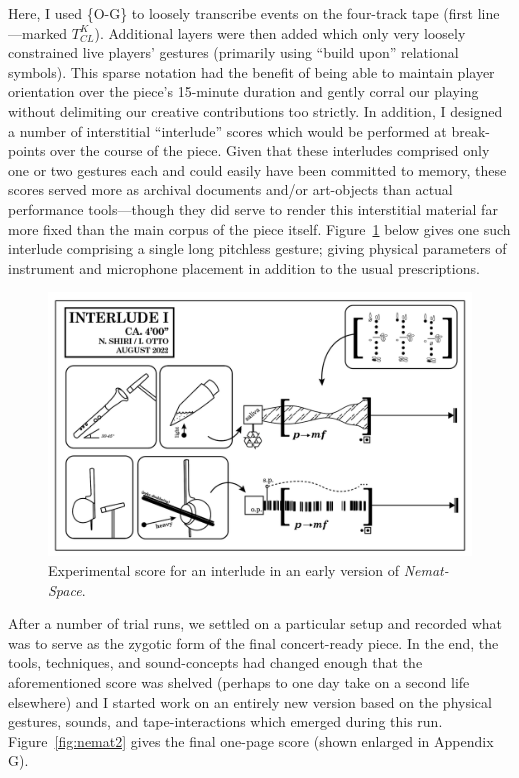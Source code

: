     \noindent Here, I used \{O-G\} to loosely transcribe events on the four-track tape (first line---marked $T^{K}_{CL}$). Additional layers were then added which only very loosely constrained live players' gestures (primarily using ``build upon'' relational symbols). This sparse notation had the benefit of being able to maintain player orientation over the piece's 15-minute duration and gently corral our playing without delimiting our creative contributions too strictly. In addition, I designed a number of interstitial ``interlude'' scores which would be performed at break-points over the course of the piece. Given that these interludes comprised only one or two gestures each and could easily have been committed to memory, these scores served more as archival documents and/or art-objects than actual performance tools---though they did serve to render this interstitial material far more fixed than the main corpus of the piece itself. Figure~\ref{fig:experimentalinterlude} below gives one such interlude comprising a single long pitchless gesture; giving physical parameters of instrument and microphone placement in addition to the usual prescriptions.
    
        \begin{figure}
            \centering
            \includegraphics[width=.8\textwidth]{images/chapter4/nemat-interlude.png}
            \captionsetup{width=.5\textwidth}
            \caption{Experimental score for an interlude in an early version of \textit{Nemat-Space}.}
            \label{fig:experimentalinterlude}
        \end{figure}

    After a number of trial runs, we settled on a particular setup and recorded what was to serve as the zygotic form of the final concert-ready piece. In the end, the tools, techniques, and sound-concepts had changed enough that the aforementioned score was shelved (perhaps to one day take on a second life elsewhere) and I started work on an entirely new version based on the physical gestures, sounds, and tape-interactions which emerged during this run. Figure~\ref{fig:nemat2} gives the final one-page score (shown enlarged in Appendix G).
    
